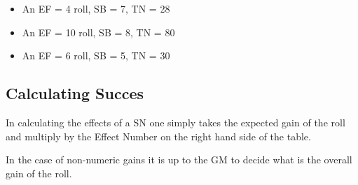 \begin{itemize}
	\item An EF = 4 roll, SB = 7, TN = 28
	\item An EF = 10 roll, SB = 8, TN = 80
	\item An EF = 6 roll, SB = 5, TN = 30
\end{itemize}

\subsection{Calculating Succes}
In calculating the effects of a SN one simply takes the expected 
gain of the roll and multiply by the Effect Number on the right hand 
side of the table.

In the case of non-numeric gains it is up to the GM to decide 
what is the overall gain of the roll.




